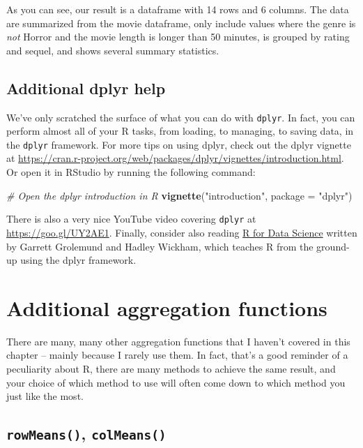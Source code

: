 \documentclass[]{book}
\newenvironment{Shaded}{\begin{snugshade}}{\end{snugshade}}
\newcommand{\KeywordTok}[1]{\textcolor[rgb]{0.13,0.29,0.53}{\textbf{{#1}}}}
\newcommand{\DataTypeTok}[1]{\textcolor[rgb]{0.13,0.29,0.53}{{#1}}}
\newcommand{\StringTok}[1]{\textcolor[rgb]{0.31,0.60,0.02}{{#1}}}
\newcommand{\CommentTok}[1]{\textcolor[rgb]{0.56,0.35,0.01}{\textit{{#1}}}}
\newcommand{\NormalTok}[1]{{#1}}
\theoremstyle{definition}
\theoremstyle{definition}
\theoremstyle{remark}
\begin{document}
As you can see, our result is a dataframe with 14 rows and 6 columns.
The data are summarized from the movie dataframe, only include values
where the genre is \emph{not} Horror and the movie length is longer than
50 minutes, is grouped by rating and sequel, and shows several summary
statistics.

\subsection{Additional dplyr help}\label{additional-dplyr-help}

We've only scratched the surface of what you can do with \texttt{dplyr}.
In fact, you can perform almost all of your R tasks, from loading, to
managing, to saving data, in the \texttt{dplyr} framework. For more tips
on using dplyr, check out the dplyr vignette at
\url{https://cran.r-project.org/web/packages/dplyr/vignettes/introduction.html}.
Or open it in RStudio by running the following command:

\begin{Shaded}
\begin{Highlighting}[]
\CommentTok{# Open the dplyr introduction in R}
\KeywordTok{vignette}\NormalTok{(}\StringTok{"introduction"}\NormalTok{, }\DataTypeTok{package =} \StringTok{"dplyr"}\NormalTok{)}
\end{Highlighting}
\end{Shaded}

There is also a very nice YouTube video covering \texttt{dplyr} at
\url{https://goo.gl/UY2AE1}. Finally, consider also reading
\href{http://r4ds.had.co.nz/}{R for Data Science} written by Garrett
Grolemund and Hadley Wickham, which teaches R from the ground-up using
the dplyr framework.

\section{Additional aggregation
functions}\label{additional-aggregation-functions}

There are many, many other aggregation functions that I haven't covered
in this chapter -- mainly because I rarely use them. In fact, that's a
good reminder of a peculiarity about R, there are many methods to
achieve the same result, and your choice of which method to use will
often come down to which method you just like the most.

\subsection{\texorpdfstring{\texttt{rowMeans()},
\texttt{colMeans()}}{rowMeans(), colMeans()}}\label{rowmeans-colmeans}
\end{document}
